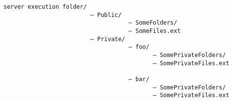 \begin{verbatim}
server execution folder/
                         — Public/
                                    — SomeFolders/
                                    — SomeFiles.ext
                         — Private/
                                    — foo/
                                           — SomePrivateFolders/
                                           — SomePrivateFiles.ext

                                    — bar/
                                           — SomePrivateFolders/
                                           — SomePrivateFiles.ext
\end{verbatim}   